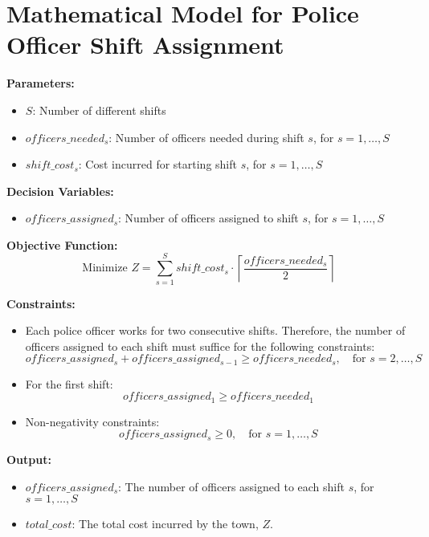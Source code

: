 \documentclass{article}
\begin{document}
\section*{Mathematical Model for Police Officer Shift Assignment}

\textbf{Parameters:}
\begin{itemize}
    \item $S$: Number of different shifts
    \item $officers\_needed_s$: Number of officers needed during shift $s$, for $s = 1, \ldots, S$
    \item $shift\_cost_s$: Cost incurred for starting shift $s$, for $s = 1, \ldots, S$
\end{itemize}

\textbf{Decision Variables:}
\begin{itemize}
    \item $officers\_assigned_s$: Number of officers assigned to shift $s$, for $s = 1, \ldots, S$
\end{itemize}

\textbf{Objective Function:}
\[
\text{Minimize } Z = \sum_{s=1}^{S} shift\_cost_s \cdot \left\lceil \frac{officers\_needed_s}{2} \right\rceil
\]

\textbf{Constraints:}
\begin{itemize}
    \item Each police officer works for two consecutive shifts. Therefore, the number of officers assigned to each shift must suffice for the following constraints:
    \[
    officers\_assigned_s + officers\_assigned_{s-1} \geq officers\_needed_s, \quad \text{for } s = 2, \ldots, S
    \]
    \item For the first shift:
    \[
    officers\_assigned_1 \geq officers\_needed_1
    \]
    \item Non-negativity constraints:
    \[
    officers\_assigned_s \geq 0, \quad \text{for } s = 1, \ldots, S
    \]
\end{itemize}

\textbf{Output:}
\begin{itemize}
    \item $officers\_assigned_s$: The number of officers assigned to each shift $s$, for $s = 1, \ldots, S$
    \item $total\_cost$: The total cost incurred by the town, $Z$.
\end{itemize}
\end{document}
